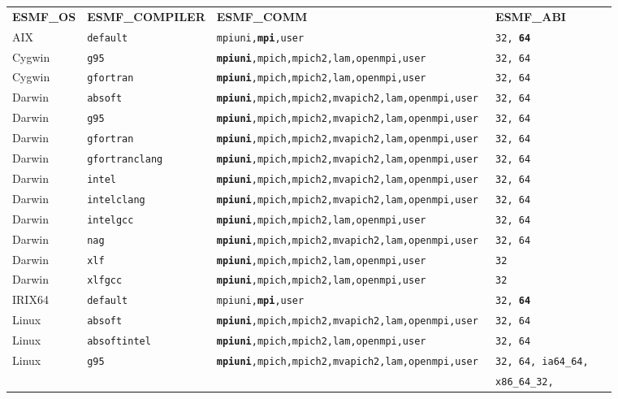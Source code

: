 \begin{longtable}{lllll}
  {\bfseries\footnotesize ESMF\_OS} &{\bfseries\footnotesize ESMF\_COMPILER} & {\bfseries\footnotesize ESMF\_COMM} & {\bfseries\footnotesize ESMF\_ABI} \\

AIX     &\tt default     &\tt mpiuni,{\bf mpi},user      &\tt 32, {\bf 64} \\
Cygwin  &\tt g95         &\tt {\bf mpiuni},mpich,mpich2,lam,openmpi,user &\tt 32, 64 \\
Cygwin  &\tt gfortran    &\tt {\bf mpiuni},mpich,mpich2,lam,openmpi,user &\tt 32, 64 \\
Darwin  &\tt absoft      &\tt {\bf mpiuni},mpich,mpich2,mvapich2,lam,openmpi,user &\tt 32, 64 \\
Darwin  &\tt g95         &\tt {\bf mpiuni},mpich,mpich2,mvapich2,lam,openmpi,user &\tt 32, 64 \\
Darwin  &\tt gfortran    &\tt {\bf mpiuni},mpich,mpich2,mvapich2,lam,openmpi,user &\tt 32, 64 \\
Darwin  &\tt gfortranclang &\tt {\bf mpiuni},mpich,mpich2,mvapich2,lam,openmpi,user &\tt 32, 64 \\
Darwin  &\tt intel       &\tt {\bf mpiuni},mpich,mpich2,mvapich2,lam,openmpi,user &\tt 32, 64 \\
Darwin  &\tt intelclang  &\tt {\bf mpiuni},mpich,mpich2,mvapich2,lam,openmpi,user &\tt 32, 64 \\
Darwin  &\tt intelgcc    &\tt {\bf mpiuni},mpich,mpich2,lam,openmpi,user &\tt 32, 64 \\
Darwin  &\tt nag         &\tt {\bf mpiuni},mpich,mpich2,mvapich2,lam,openmpi,user &\tt 32, 64 \\
Darwin  &\tt xlf         &\tt {\bf mpiuni},mpich,mpich2,lam,openmpi,user &\tt 32 \\
Darwin  &\tt xlfgcc      &\tt {\bf mpiuni},mpich,mpich2,lam,openmpi,user &\tt 32 \\
IRIX64  &\tt default     &\tt mpiuni,{\bf mpi},user     &\tt 32, {\bf 64} \\
Linux   &\tt absoft      &\tt {\bf mpiuni},mpich,mpich2,mvapich2,lam,openmpi,user &\tt 32, 64 \\
Linux   &\tt absoftintel &\tt {\bf mpiuni},mpich,mpich2,lam,openmpi,user &\tt 32, 64  \\
Linux   &\tt g95         &\tt {\bf mpiuni},mpich,mpich2,mvapich2,lam,openmpi,user &\tt 32, 64, ia64\_64, \\
        &                &                              &\tt x86\_64\_32, \\

\end{longtable}
